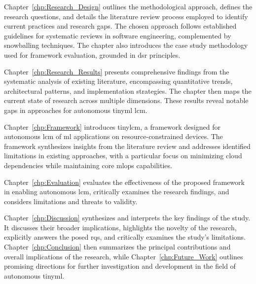 Chapter~\ref{chp:Research_Design} outlines the methodological approach, defines the research questions, and details the literature review process employed to identify current practices and research gaps. The chosen approach follows established guidelines for systematic reviews in software engineering, complemented by snowballing techniques. The chapter also introduces the case study methodology used for framework evaluation, grounded in \gls{dsr} principles.

Chapter~\ref{chp:Research_Results} presents comprehensive findings from the systematic analysis of existing literature, encompassing quantitative trends, architectural patterns, and implementation strategies. The chapter then maps the current state of research across multiple dimensions. These results reveal notable gaps in approaches for autonomous \gls{tinyml} \gls{lcm}.

Chapter~\ref{chp:Framework} introduces \gls{tinylcm}, a framework designed for autonomous \gls{lcm} of \gls{ml} applications on resource-constrained devices. The framework synthesizes insights from the literature review and addresses identified limitations in existing approaches, with a particular focus on minimizing cloud dependencies while maintaining core \gls{mlops} capabilities.

Chapter~\ref{chp:Evaluation} evaluates the effectiveness of the proposed framework in enabling autonomous \gls{lcm}, critically examines the research findings, and considers limitations and threats to validity.

Chapter~\ref{chp:Discussion} synthesizes and interprets the key findings of the study. It discusses their broader implications, highlights the novelty of the research, explicitly answers the posed \glspl{rq}, and critically examines the study's limitations. Chapter~\ref{chp:Conclusion} then summarizes the principal contributions and overall implications of the research, while Chapter~\ref{chp:Future_Work} outlines promising directions for further investigation and development in the field of autonomous \gls{tinyml}.